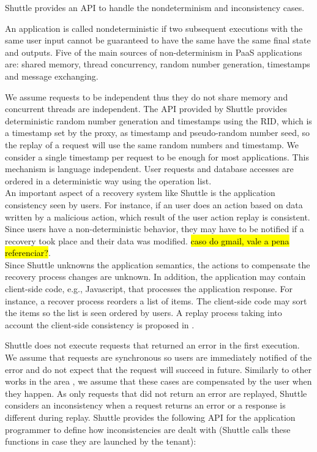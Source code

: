 Shuttle provides an \ac{API} to handle the nondeterminism and inconsistency cases.

An application is called nondeterministic if two subsequent executions with the same user input cannot be guaranteed to have the same have the same final state and outputs. Five of the main sources of non-determinism in \ac{PaaS} applications are: shared memory, thread concurrency, random number generation, timestamps and message exchanging.

We assume requests to be independent thus they do not share memory and concurrent threads are independent. The \ac{API} provided by Shuttle provides deterministic random number generation and timestamps using the \acf{RID}, which is a timestamp set by the proxy, as timestamp and pseudo-random number seed, so the replay of a request will use the same random numbers and timestamp. We consider a single timestamp per request to be enough for most applications. This mechanism is language independent. User requests and database accesses are ordered in a deterministic way using the operation list. \\

An important aspect of a recovery system like Shuttle is the application consistency seen by users. For instance, if an user does an action based on data written by a malicious action, which result of the user action replay is consistent. Since users have a non-deterministic behavior, they may have to be notified if a recovery took place and their data was modified. \hl{caso do gmail, vale a pena referenciar?}. \\


Since Shuttle unknowns the application semantics, the actions to compensate the recovery process changes are unknown. In addition, the application may contain client-side code, e.g., Javascript, that processes the application response. For instance, a recover process reorders a list of items. The client-side code may sort the items so the list is seen ordered by users. A replay process taking into account the client-side consistency is proposed in \cite{warp}.


Shuttle does not execute requests that returned an error in the first execution. We assume that requests are synchronous so users are immediately notified of the error and do not expect that the request will succeed in future. Similarly to other works in the area \cite{undoForOperators}, we assume that these cases are compensated by the user when they happen. As only requests that did not return an error are replayed, Shuttle considers an inconsistency when a request returns an error or a response is different during replay. Shuttle provides the following \ac{API} for the application programmer to define how inconsistencies are dealt with (Shuttle calls these functions in case they are launched by the tenant):

